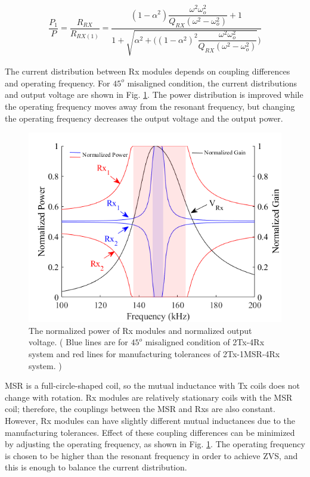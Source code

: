 \documentclass[journal]{IEEEtran}
\begin{document}
\begin{equation}
\label{equ:P1_RS-PM}
 \begin{split}
 \dfrac{P_{1}}{P} = \dfrac{R_{RX}}{R_{RX(1)}}
=\dfrac{(1-\alpha^2)\dfrac{\omega^2 \omega_o^2}{Q_{RX}(\omega^2-\omega_o^2)}+1 }{1+\sqrt{\alpha^2+ ((1-\alpha^2)^2\dfrac{\omega^2 \omega_o^2}{Q_{RX}(\omega^2-\omega_o^2)}})}
\end{split}
\end{equation}

The current distribution between Rx modules depends on coupling differences and operating frequency. For $45^o$ misaligned condition, the current distributions and output voltage are shown in Fig.  \ref{fig:power_share}. The power distribution is improved while the operating frequency moves away from the resonant frequency, but changing the operating frequency decreases the output voltage and the output power.
\begin{figure}[]
     \centering
         \includegraphics[width=0.9\linewidth]{three_coil_power4.png}
        \caption{ The normalized power of Rx modules and normalized output voltage. ( Blue lines are for $45^o$ misaligned condition of 2Tx-4Rx system and red lines for manufacturing tolerances of 2Tx-1MSR-4Rx system. ) } 
        \label{fig:power_share}
\end{figure}

MSR is a full-circle-shaped coil, so the mutual inductance with Tx coils does not change with rotation. Rx modules are relatively stationary coils with the MSR coil; therefore, the couplings between the MSR and Rxs are also constant. 
However, Rx modules can have slightly different mutual inductances due to the manufacturing tolerances. 
Effect of these coupling differences can be minimized by adjusting the operating frequency, as shown in Fig. \ref{fig:power_share}. The operating frequency is chosen to be higher than the resonant frequency in order to achieve ZVS, and this is enough to balance the current distribution. 
\end{document}
